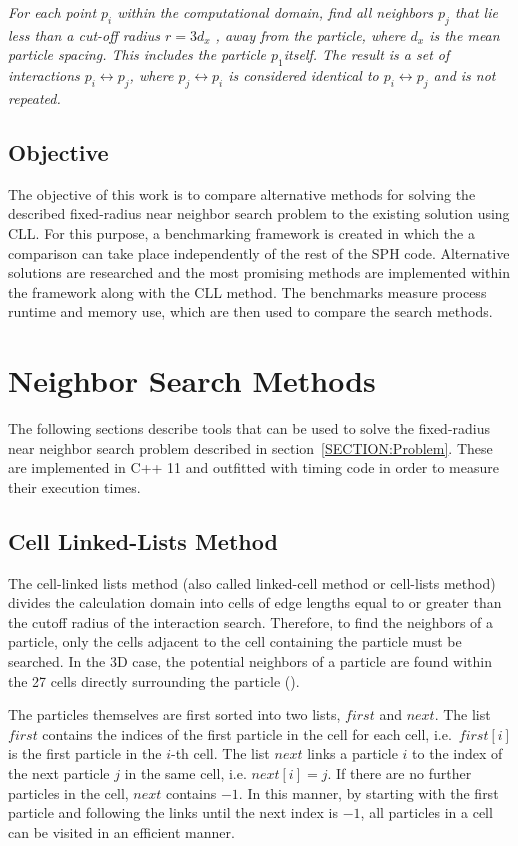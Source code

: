 {\itshape
For each point $p_i$ within the computational domain, find all neighbors $p_j$ that lie less than a cut-off radius $r = 3d_x$ , away from the particle, where $d_x$ is the mean particle spacing. This includes the particle $p_1$itself. The result is a set of interactions $p_i \leftrightarrow p_j$, where  $p_j \leftrightarrow p_i $ is considered identical to $p_i \leftrightarrow p_j$ and is not repeated.}

\section{Objective}
\label{SECTION:Objective}
The objective of this work is to compare alternative methods for solving the described fixed-radius near neighbor search problem to the existing solution using CLL. For this purpose, a benchmarking framework is created in which the a comparison can take place independently of the rest of the SPH code. Alternative solutions are researched and the most promising methods are implemented within the framework along with the CLL method. The benchmarks measure process runtime and memory use, which are then used to compare the search methods.

\chapter{Neighbor Search Methods}

The following sections describe tools that can be used to solve the fixed-radius near neighbor search problem described in section~\ref{SECTION:Problem}. These are implemented in C++ 11 and outfitted with timing code in order to measure their execution times. 

\section{Cell Linked-Lists Method}

The cell-linked lists method (also called linked-cell method or cell-lists method) divides the calculation domain into cells of edge lengths equal to or greater than the cutoff radius of the interaction search. Therefore, to find the neighbors of a particle, only the cells adjacent to the cell containing the particle must be searched. In the 3D case, the potential neighbors of a particle are found within the 27 cells directly surrounding the particle (\cite{Weygand18}).

The particles themselves are first sorted into two lists, $first$ and $next$. The list $first$ contains the indices of the first particle in the cell for each cell, i.e.\ $first[i]$ is the first particle in the  $i$-th cell.   The list $next$ links a particle $i$ to the index of the next particle $j$ in the same cell, i.e. $next[i] = j$. If there are no further particles in the cell, $next$ contains $-1$. In this manner, by starting with the first particle and following the links until the next index is $-1$, all particles in a cell can be visited in an efficient manner.

